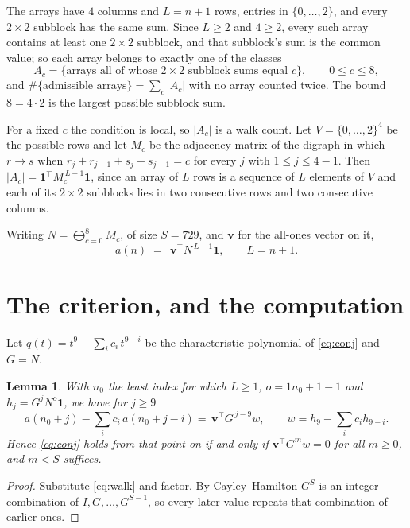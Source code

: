 \documentclass[11pt,a4paper]{article}
\theoremstyle{plain}
\newtheorem{lemma}[theorem]{Lemma}
\theoremstyle{definition}
\begin{document}
The arrays have $4$ columns and $L=n+1$ rows, entries in
$\{0,\dots,2\}$, and every $2\times2$ subblock has the same sum. Since $L\ge2$ and
$4\ge2$, every such array contains at least one $2\times2$ subblock, and that subblock's
sum is the common value; so each array belongs to exactly one of the classes
\[
A_c=\{\text{arrays all of whose }2\times2\text{ subblock sums equal }c\},
\qquad 0\le c\le 8,
\]
and $\#\{\text{admissible arrays}\}=\sum_c |A_c|$ with no array counted twice. The bound
$8=4\cdot2$ is the largest possible subblock sum.

For a fixed $c$ the condition is local, so $|A_c|$ is a walk count. Let
$V=\{0,\dots,2\}^{4}$ be the possible rows and let $M_c$ be the adjacency
matrix of the digraph in which $r\to s$ when
$r_j+r_{j+1}+s_j+s_{j+1}=c$ for every $j$ with $1\le j\le 4-1$. Then
$|A_c|=\mathbf{1}^{\!\top}M_c^{\,L-1}\mathbf{1}$, since an array of $L$ rows is a
sequence of $L$ elements of $V$ and each of its $2\times2$ subblocks lies in two consecutive
rows and two consecutive columns.

Writing $N=\bigoplus_{c=0}^{8}M_c$, of size $S=729$, and $\mathbf{v}$ for the
all-ones vector on it,
\begin{equation}\label{eq:walk}
a(n)\;=\;\,\mathbf{v}^{\!\top}N^{\,L-1}\mathbf{1},\qquad L=n+1.
\end{equation}

\section{The criterion, and the computation}

Let $q(t)=t^{9}-\sum_i c_i\,t^{9-i}$ be the characteristic polynomial of
\eqref{eq:conj} and $G=N$.

\begin{lemma}\label{lem:crit}
With $n_0$ the least index for which $L\ge1$, $o=1n_0+1-1$ and
$h_j=G^{j}N^{o}\mathbf{1}$, we have for $j\ge9$
\[
a(n_0+j)-\sum_i c_i\,a(n_0+j-i)=\,\mathbf{v}^{\!\top}G^{\,j-9}w,
\qquad w=h_{9}-\sum_i c_ih_{9-i} .
\]
Hence \eqref{eq:conj} holds from that point on if and only if
$\mathbf{v}^{\!\top}G^{m}w=0$ for all $m\ge0$, and $m<S$ suffices.
\end{lemma}

\begin{proof}
Substitute \eqref{eq:walk} and factor. By Cayley--Hamilton $G^{S}$ is an integer
combination of $I,G,\dots,G^{S-1}$, so every later value repeats that combination of
earlier ones.
\end{proof}
\end{document}
